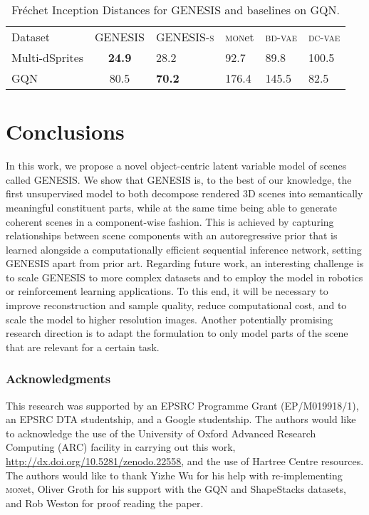\documentclass{article}
\begin{document}
\begin{table}[h!]
    \centering
    \caption{Fr\'{e}chet Inception Distances for \gls{GENESIS} and baselines on GQN.}
    \label{tab:fid}
    \begin{tabularx}{0.8\textwidth}{l c*{4}{Y}}
        \toprule
        Dataset & \gls{GENESIS} & \mbox{\gls{GENESIS}\textsc{-s}} & \textsc{mon}et & \textsc{bd-vae} & \textsc{dc-vae} \\
        \cmidrule(r){1-1} \cmidrule(lr){2-4} \cmidrule(r){5-6}
        Multi-dSprites & \textbf{24.9} & 28.2          & 92.7  & 89.8  & 100.5 \\
        GQN            & 80.5          & \textbf{70.2} & 176.4 & 145.5 & 82.5 \\
        \bottomrule
    \end{tabularx}
\end{table}

 \section{Conclusions}
\label{sec:conclusions}

In this work, we propose a novel object-centric latent variable model of  scenes called \gls{GENESIS}.
We show that \gls{GENESIS} is, to the best of our knowledge, the first unsupervised model to both decompose rendered 3D scenes into semantically meaningful constituent parts, while at the same time being able to generate coherent scenes in a component-wise fashion.
This is achieved by capturing relationships between scene components with an autoregressive prior that is learned alongside a computationally efficient sequential inference network, setting \gls{GENESIS} apart from prior art.
Regarding future work, an interesting challenge is to scale \gls{GENESIS} to more complex datasets and to employ the model in robotics or reinforcement learning applications.
To this end, it will be necessary to improve reconstruction and sample quality, reduce computational cost, and to scale the model to higher resolution images.
Another potentially promising research direction is to adapt the formulation to only model parts of the scene that are relevant for a certain task.
 
\clearpage


\subsubsection*{Acknowledgments}
This research was supported by an EPSRC Programme Grant (EP/M019918/1), an EPSRC DTA studentship, and a Google studentship.
The authors would like to acknowledge the use of the University of Oxford Advanced Research Computing (ARC) facility in carrying out this work, \url{http://dx.doi.org/10.5281/zenodo.22558}, and the use of Hartree Centre resources.
The authors would like to thank Yizhe Wu for his help with re-implementing \textsc{mon}et, Oliver Groth for his support with the GQN and ShapeStacks datasets, and Rob Weston for proof reading the paper.
\end{document}
